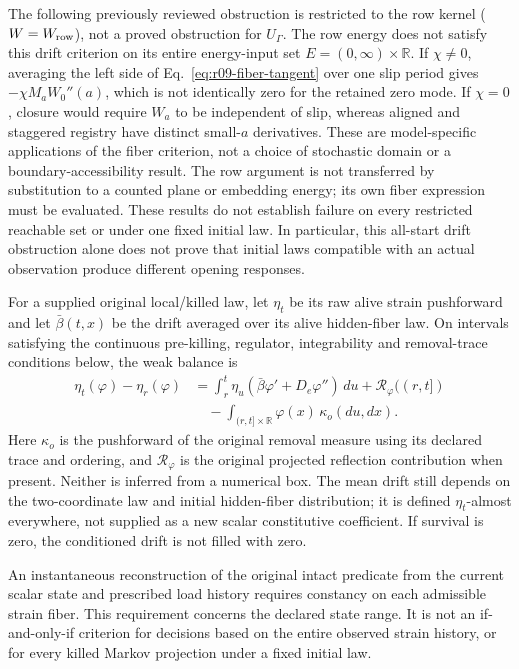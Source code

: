 \documentclass[11pt]{article}
\begin{document}
The following previously reviewed obstruction is restricted to the row kernel
($W=W_{\rm row}$), not a proved obstruction for $U_\Gamma$. The row energy
does not satisfy this drift criterion on its
entire energy-input set $E=(0,\infty)\times\mathbb R$. If $\chi\ne0$,
averaging the left side of Eq.~\eqref{eq:r09-fiber-tangent} over one slip
period gives $-\chi M_aW_0''(a)$, which is not identically zero for the
retained zero mode. If $\chi=0$, closure would require $W_a$ to be independent
of slip, whereas aligned and staggered registry have distinct small-$a$
derivatives. These are model-specific applications of the fiber criterion,
not a choice of stochastic domain or a boundary-accessibility result.
The row argument is not transferred by substitution to a counted plane or
embedding energy; its own fiber expression must be evaluated. These results
do not establish failure on every restricted reachable set or under one
fixed initial law. In particular, this all-start drift obstruction alone
does not prove that initial laws compatible with an actual observation
produce different opening responses.

For a supplied original local/killed law, let $\eta_t$ be its raw alive
strain pushforward and let $\bar\beta(t,x)$ be the drift averaged over its
alive hidden-fiber law. On intervals satisfying the continuous pre-killing,
regulator, integrability and removal-trace conditions below, the weak balance
is
\begin{align}
 \eta_t(\varphi)-\eta_r(\varphi)
 &=\int_r^t\eta_u(\bar\beta\varphi'+D_e\varphi'')\,du
       +\mathcal R_\varphi((r,t])\nonumber\\
 &\quad-\int_{(r,t]\times\mathbb R}\varphi(x)\,\kappa_o(du,dx).
 \label{eq:r09-projected-balance}
\end{align}
Here $\kappa_o$ is the pushforward of the original removal measure using
its declared trace and ordering, and $\mathcal R_\varphi$ is the original
projected reflection contribution when present. Neither is inferred from a
numerical box. The mean drift still depends on the two-coordinate law and
initial hidden-fiber distribution; it is defined $\eta_t$-almost everywhere,
not supplied as a new scalar constitutive coefficient. If survival is zero,
the conditioned drift is not filled with zero.


An instantaneous reconstruction of the original intact predicate from the current scalar state and prescribed load history requires constancy on each admissible strain fiber. This requirement concerns the declared state range. It is not an if-and-only-if criterion for decisions based on the entire observed strain history, or for every killed Markov projection under a fixed initial law.
\end{document}
